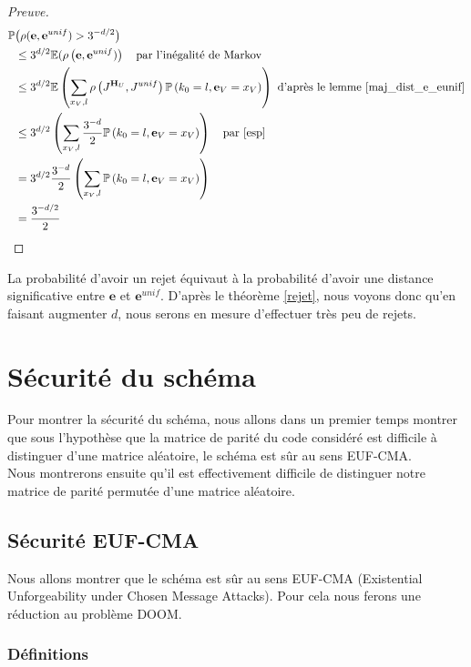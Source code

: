 \documentclass[12pt]{article}
\theoremstyle{plain}
\theoremstyle{definition}
\newcommand{\e}{\mathbf{e}}
\begin{document}
\begin{proof}[Preuve]
\begin{equation*}
\begin{split}
\mathbb{P}&\big(\rho(\e,\e^{unif})>3^{-d/2}\big) \\
&\leq 3^{d/2}\mathbb{E}(\rho\left(\e,\e^{unif})\right) \quad \text{par l'inégalité de Markov}\\
&\leq 3^{d/2}\mathbb{E}\left(\sum\limits_{x_V,l} \rho\left(J^{\mathbf{H}_U},J^{unif}\right)\mathbb{P}\left(k_0 = l , \e_V = x_V\right)\right) \text{ d'après le lemme \ref{maj_dist_e_eunif}}\\
&\leq 3^{d/2}\left(\sum\limits_{x_V,l} \frac{3^{-d}}{2}\mathbb{P}\left(k_0 = l ,\e_V = x_V\right)\right) \quad \text{par \eqref{esp}}\\
&= 3^{d/2} \frac{3^{-d}}{2}\left(\sum\limits_{x_V,l}\mathbb{P}\left(k_0 = l ,\e_V = x_V\right)\right) \\
&= \frac{3^{-d/2}}{2}\\
\end{split}
\end{equation*}
\end{proof}


\noindent La probabilité d'avoir un rejet équivaut à la probabilité d'avoir une distance significative entre $\e$ et $\e^{unif}$. D'après le théorème \ref{rejet}, nous voyons donc qu'en faisant augmenter $d$, nous serons en mesure d'effectuer très peu de rejets.


\section{Sécurité du schéma}
Pour montrer la sécurité du schéma, nous allons dans un premier temps montrer que sous l'hypothèse que la matrice de parité du code considéré est difficile à distinguer d'une matrice aléatoire, le schéma est sûr au sens EUF-CMA.\\
Nous montrerons ensuite qu'il est effectivement difficile de distinguer notre matrice de parité permutée d'une matrice aléatoire. \\

\subsection{Sécurité EUF-CMA}
Nous allons montrer que le schéma est sûr au sens EUF-CMA (Existential Unforgeability under Chosen Message Attacks). Pour cela nous ferons une réduction au problème DOOM.
\subsubsection{Définitions}
\end{document}
